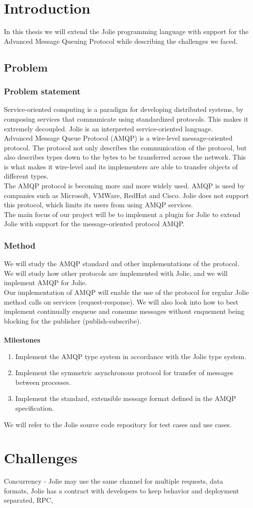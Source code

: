 \section{Introduction}
In this thesis we will extend the Jolie programming language with support for the Advanced Message Queuing Protocol while describing the challenges we faced.
\subsection{Problem}
\subsubsection{Problem statement}
Service-oriented computing is a paradigm for developing distributed systems, by composing services that communicate using standardized protocols. This makes it extremely decoupled. Jolie is an interpreted service-oriented language.\\
Advanced Message Queue Protocol (AMQP) is a wire-level message-oriented protocol. The protocol not only describes the communication of the protocol, but also describes types down to the bytes to be transferred across the network. This is what makes it wire-level and its implementers are able to transfer objects of different types.\\
The AMQP protocol is becoming more and more widely used. AMQP is used by companies such as Microsoft, VMWare, RedHat and Cisco. Jolie does not support this protocol, which limits its users from using AMQP services.\\
The main focus of our project will be to implement a plugin for Jolie to extend Jolie with support for the message-oriented protocol AMQP.
\subsubsection{Method}
We will study the AMQP standard and other implementations of the protocol. We will study how other protocols are implemented with Jolie, and we will implement AMQP for Jolie.\\
Our implementation of AMQP will enable the use of the protocol for regular Jolie method calls on services (request-response). We will also look into how to best implement continually enqueue and consume messages without enquement being blocking for the publisher (publish-subscribe).\\
\\\textbf{Milestones}
\begin{enumerate}
\item Implement the AMQP type system in accordance with the Jolie type system.
\item Implement the symmetric asynchronous protocol for transfer of messages between processes.
\item Implement the standard, extensible message format defined in the AMQP specification.
\end{enumerate}

We will refer to the Jolie source code repository for test cases and use cases.
\section{Challenges}
Concurrency - Jolie may use the same channel for multiple requests, data formats, Jolie has a contract with developers to keep behavior and deployment separated, RPC,
\newpage